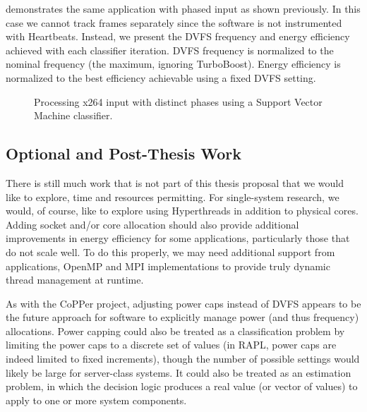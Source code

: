  demonstrates the same  application with phased input as shown previously.
In this case we cannot track frames separately since the software is not instrumented with Heartbeats.
Instead, we present the DVFS frequency and energy efficiency achieved with each classifier iteration.
DVFS frequency is normalized to the nominal frequency (the maximum, ignoring TurboBoost).
Energy efficiency is normalized to the best efficiency achievable using a fixed DVFS setting.

\begin{figure}[t]
  
  \caption{Processing x264 input with distinct phases using a Support Vector Machine classifier.}
  \label{fig:classifier-phases-x264}
\end{figure}



\subsection{Optional and Post-Thesis Work}

There is still much work that is not part of this thesis proposal that we would like to explore, time and resources permitting.
For single-system research, we would, of course, like to explore using Hyperthreads in addition to physical cores.
Adding socket and/or core allocation should also provide additional improvements in energy efficiency for some applications, particularly those that do not scale well.
To do this properly, we may need additional support from applications, OpenMP and MPI implementations to provide truly dynamic thread management at runtime.

As with the CoPPer project, adjusting power caps instead of DVFS appears to be the future approach for software to explicitly manage power (and thus frequency) allocations.
Power capping could also be treated as a classification problem by limiting the power caps to a discrete set of values (\eg in RAPL, power caps are indeed limited to fixed increments), though the number of possible settings would likely be large for server-class systems.
It could also be treated as an estimation problem, in which the decision logic produces a real value (or vector of values) to apply to one or more system components.

